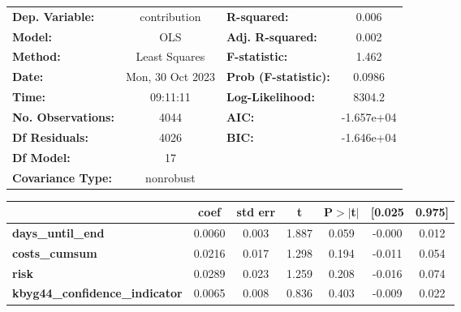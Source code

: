 \begin{center}
\begin{tabular}{lclc}
\toprule
\textbf{Dep. Variable:}                     &   contribution   & \textbf{  R-squared:         } &     0.006   \\
\textbf{Model:}                             &       OLS        & \textbf{  Adj. R-squared:    } &     0.002   \\
\textbf{Method:}                            &  Least Squares   & \textbf{  F-statistic:       } &     1.462   \\
\textbf{Date:}                              & Mon, 30 Oct 2023 & \textbf{  Prob (F-statistic):} &   0.0986    \\
\textbf{Time:}                              &     09:11:11     & \textbf{  Log-Likelihood:    } &    8304.2   \\
\textbf{No. Observations:}                  &        4044      & \textbf{  AIC:               } & -1.657e+04  \\
\textbf{Df Residuals:}                      &        4026      & \textbf{  BIC:               } & -1.646e+04  \\
\textbf{Df Model:}                          &          17      & \textbf{                     } &             \\
\textbf{Covariance Type:}                   &    nonrobust     & \textbf{                     } &             \\
\bottomrule
\end{tabular}
\begin{tabular}{lcccccc}
                                            & \textbf{coef} & \textbf{std err} & \textbf{t} & \textbf{P$> |$t$|$} & \textbf{[0.025} & \textbf{0.975]}  \\
\midrule
\textbf{days\_until\_end}                   &       0.0060  &        0.003     &     1.887  &         0.059        &       -0.000    &        0.012     \\
\textbf{costs\_cumsum}                      &       0.0216  &        0.017     &     1.298  &         0.194        &       -0.011    &        0.054     \\
\textbf{risk}                               &       0.0289  &        0.023     &     1.259  &         0.208        &       -0.016    &        0.074     \\
\textbf{kbyg44\_confidence\_indicator}      &       0.0065  &        0.008     &     0.836  &         0.403        &       -0.009    &        0.022     \\

\end{tabular}
\end{center}
